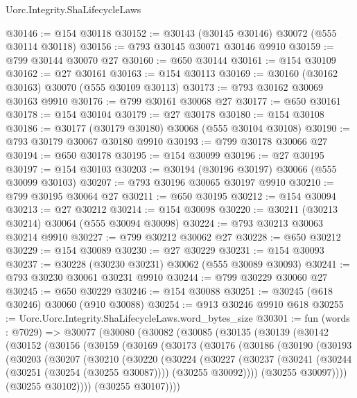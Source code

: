 \begin{lexlean}{Uorc.Integrity.ShaLifecycleLaws}
\begin{coremodule}
@30146 := @154 @30118
@30152 := @30143 (@30145 @30146) @30072 (@555 @30114 @30118)
@30156 := @793 @30145 @30071 @30146 @9910
@30159 := @799 @30144 @30070 @27
@30160 := @650 @30144
@30161 := @154 @30109
@30162 := @27 @30161
@30163 := @154 @30113
@30169 := @30160 (@30162 @30163) @30070 (@555 @30109 @30113)
@30173 := @793 @30162 @30069 @30163 @9910
@30176 := @799 @30161 @30068 @27
@30177 := @650 @30161
@30178 := @154 @30104
@30179 := @27 @30178
@30180 := @154 @30108
@30186 := @30177 (@30179 @30180) @30068 (@555 @30104 @30108)
@30190 := @793 @30179 @30067 @30180 @9910
@30193 := @799 @30178 @30066 @27
@30194 := @650 @30178
@30195 := @154 @30099
@30196 := @27 @30195
@30197 := @154 @30103
@30203 := @30194 (@30196 @30197) @30066 (@555 @30099 @30103)
@30207 := @793 @30196 @30065 @30197 @9910
@30210 := @799 @30195 @30064 @27
@30211 := @650 @30195
@30212 := @154 @30094
@30213 := @27 @30212
@30214 := @154 @30098
@30220 := @30211 (@30213 @30214) @30064 (@555 @30094 @30098)
@30224 := @793 @30213 @30063 @30214 @9910
@30227 := @799 @30212 @30062 @27
@30228 := @650 @30212
@30229 := @154 @30089
@30230 := @27 @30229
@30231 := @154 @30093
@30237 := @30228 (@30230 @30231) @30062 (@555 @30089 @30093)
@30241 := @793 @30230 @30061 @30231 @9910
@30244 := @799 @30229 @30060 @27
@30245 := @650 @30229
@30246 := @154 @30088
@30251 := @30245 (@618 @30246) @30060 (@910 @30088)
@30254 := @913 @30246 @9910 @618
@30255 := Uorc.Uorc.Integrity.ShaLifecycleLaws.word_bytes_size
@30301 := fun (words : @7029) =>
  @30077
    (@30080
      (@30082
        (@30085
          (@30135
            (@30139
              (@30142
                (@30152
                  (@30156
                    (@30159
                      (@30169
                        (@30173
                          (@30176
                            (@30186
                              (@30190
                                (@30193
                                  (@30203
                                    (@30207
                                      (@30210
                                        (@30220
                                          (@30224
                                            (@30227
                                              (@30237
                                                (@30241
                                                  (@30244 (@30251 (@30254 (@30255 @30087))))
                                                  (@30255 @30092))))
                                            (@30255 @30097))))
                                      (@30255 @30102))))
                                (@30255 @30107))))

\end{coremodule}
\end{lexlean}
